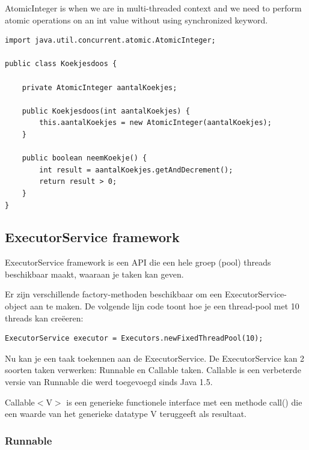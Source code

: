 AtomicInteger is when we are in multi-threaded context and we need to perform atomic operations on an int value without using synchronized keyword.
 
\begin{lstlisting}
import java.util.concurrent.atomic.AtomicInteger;

public class Koekjesdoos {

	private AtomicInteger aantalKoekjes;

	public Koekjesdoos(int aantalKoekjes) {
		this.aantalKoekjes = new AtomicInteger(aantalKoekjes);
	}

	public boolean neemKoekje() {
		int result = aantalKoekjes.getAndDecrement();
		return result > 0;
	}
}
\end{lstlisting}


\subsection{ExecutorService framework}

ExecutorService framework is een API die een hele groep (pool) threads beschikbaar maakt, waaraan je taken kan geven.

Er zijn verschillende factory-methoden beschikbaar om een ExecutorService-object aan te maken. De volgende lijn code toont hoe je een thread-pool met 10 threads kan 
cre\"eeren:

\begin{lstlisting}
ExecutorService executor = Executors.newFixedThreadPool(10);
\end{lstlisting}

Nu kan je een taak toekennen aan de ExecutorService. De ExecutorService kan 2 soorten taken verwerken: Runnable en Callable taken. Callable is een verbeterde versie van Runnable die werd toegevoegd sinds Java 1.5.

Callable$<$V$>$ is een generieke functionele interface  met een methode call() die een waarde van het generieke datatype V teruggeeft als resultaat. 

\subsubsection{Runnable}

